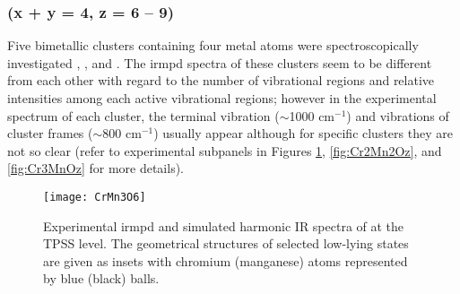 \begin{refsection}
\subsubsection{ (x + y = 4, z = 6 -- 9)}	

Five bimetallic clusters containing four metal atoms were spectroscopically investigated , , and . The \acrshort{irmpd} spectra of these clusters seem to be different from each other with regard to the number of vibrational regions and relative intensities among each active vibrational regions; however in the experimental spectrum of each cluster, the terminal  vibration ($\sim$1000 cm$^{-1}$) and vibrations of cluster frames ($\sim$800 cm$^{-1}$) usually appear although for specific clusters they are not so clear (refer to experimental subpanels in Figures \ref{fig:CrMn3O6}, \ref{fig:Cr2Mn2Oz}, and \ref{fig:Cr3MnOz} for more details).


\begin{figure}[!htb]
	\centering
	\texttt{[image: CrMn3O6]}
	\caption{Experimental \acrshort{irmpd} and simulated harmonic IR spectra of  at the TPSS level. The geometrical structures of selected low-lying states are given as insets with chromium (manganese) atoms represented by blue (black) balls.}
	\label{fig:CrMn3O6}
\end{figure}




\end{refsection}
